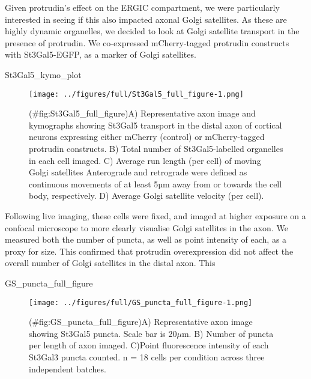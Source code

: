 \documentclass[
  12pt,
  a4paper,
]{book}
\newenvironment{Shaded}{\begin{snugshade}}{\end{snugshade}}
\newcommand{\NormalTok}[1]{#1}
\begin{document}
Given protrudin's effect on the ERGIC compartment, we were particularly interested in seeing if this also impacted axonal Golgi satellites. As these are highly dynamic organelles, we decided to look at Golgi satellite transport in the presence of protrudin. We co-expressed mCherry-tagged protrudin constructs with St3Gal5-EGFP, as a marker of Golgi satellites.

\begin{Shaded}
\begin{Highlighting}[]
\NormalTok{St3Gal5\_kymo\_plot}
\end{Highlighting}
\end{Shaded}

\begin{figure}
\centering
\texttt{[image: ../figures/full/St3Gal5\_full\_figure-1.png]}
\caption{(\#fig:St3Gal5\_full\_figure)A) Representative axon image and kymographs showing St3Gal5 transport in the distal axon of cortical neurons expressing either mCherry (control) or mCherry-tagged protrudin constructs. B) Total number of St3Gal5-labelled organelles in each cell imaged. C) Average run length (per cell) of moving Golgi satellites Anterograde and retrograde were defined as continuous movements of at least 5µm away from or towards the cell body, respectively. D) Average Golgi satellite velocity (per cell).}
\end{figure}

Following live imaging, these cells were fixed, and imaged at higher exposure on a confocal microscope to more clearly visualise Golgi satellites in the axon. We measured both the number of puncta, as well as point intensity of each, as a proxy for size. This confirmed that protrudin overexpression did not affect the overall number of Golgi satellites in the distal axon. This

\begin{Shaded}
\begin{Highlighting}[]
\NormalTok{GS\_puncta\_full\_figure}
\end{Highlighting}
\end{Shaded}

\begin{figure}
\centering
\texttt{[image: ../figures/full/GS\_puncta\_full\_figure-1.png]}
\caption{(\#fig:GS\_puncta\_full\_figure)A) Representative axon image showing St3Gal5 puncta. Scale bar is 20\(\mu\)m. B) Number of puncta per length of axon imaged. C)Point fluorescence intensity of each St3Gal3 puncta counted. n = 18 cells per condition across three independent batches.}
\end{figure}
\end{document}
